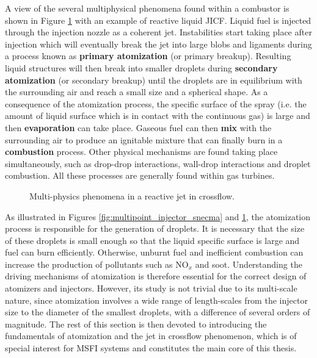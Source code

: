 A view of the several multiphysical phenomena found within a combustor is shown in Figure \ref{fig:JICF_multiphysics} with an example of reactive liquid JICF. Liquid fuel is injected through the injection nozzle as a coherent jet. Instabilities start taking place after injection which will eventually break the jet into large blobs and ligaments during a process known as \textbf{primary atomization} (or primary breakup). Resulting liquid structures will then break into smaller droplets during \textbf{secondary atomization} (or secondary breakup) until the droplets are in equilibrium with the surrounding air and reach a small size and a spherical shape. As a consequence of the atomization process, the specific surface of the spray (i.e. the amount of liquid surface which is in contact with the continuous gas) is large and then \textbf{evaporation} can take place. Gaseous fuel can then \textbf{mix} with the surrounding air  to produce an ignitable mixture that can finally burn in a \textbf{combustion} process. Other physical mechanisms are found taking place simultaneously, such as drop-drop interactions, wall-drop interactions and droplet combustion. All these processes are generally found within gas turbines.

\begin{figure}[ht]
     \centering
      \caption{Multi-physics phenomena in a reactive jet in crossflow. }
      \label{fig:JICF_multiphysics}
\end{figure}

As illustrated in Figures \ref{fig:multipoint_injector_snecma} and \ref{fig:JICF_multiphysics}, the atomization process is responsible for the generation of droplets. It is necessary that the size of these droplets is small enough so that the liquid specific surface is large and fuel can burn efficiently. Otherwise, unburnt fuel and inefficient combustion can increase the production of pollutants such as NO$_x$ and soot. Understanding the driving mechanisms of atomization is therefore essential for the correct design of atomizers and injectors. However, its study is not trivial due to its multi-scale nature, since atomization involves a wide range of length-scales from the injector size to the diameter of the smallest droplets, with a difference of several orders of magnitude.  The rest of this section is then devoted to introducing the fundamentals of atomization and the jet in crossflow phenomenon, which is of special interest for MSFI systems and constitutes the main core of this thesis.

